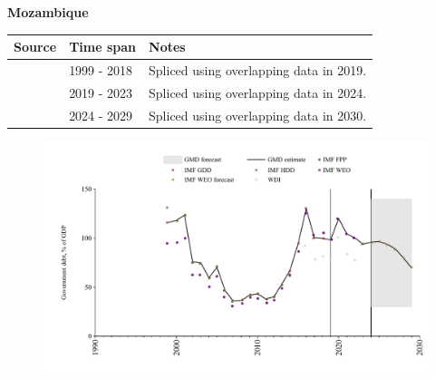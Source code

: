 \documentclass[12pt,a4paper,landscape]{article}
\begin{document}
\begin{adjustbox}{max totalsize={\paperwidth}{\paperheight},center}
\begin{minipage}[t][\textheight][t]{\textwidth}
\vspace*{0.5cm}
{}
\begin{center}
{\Large\bfseries Mozambique}
\end{center}
\vspace{0.5cm}
\begin{table}[H]
\centering
\small
\begin{tabular}{|l|l|l|}
\hline
\textbf{Source} & \textbf{Time span} & \textbf{Notes} \\
\hline
\rowcolor{white}\cite{IMF_GDD}& 1999 - 2018 &Spliced using overlapping data in 2019.\\
\rowcolor{lightgray}\cite{IMF_FPP}& 2019 - 2023 &Spliced using overlapping data in 2024.\\
\rowcolor{white}\cite{IMF_WEO_forecast}& 2024 - 2029 &Spliced using overlapping data in 2030.\\
\hline
\end{tabular}
\end{table}
\begin{figure}[H]
\centering
\includegraphics[width=\textwidth,height=0.6\textheight,keepaspectratio]{graphs/MOZ_govdebt_GDP.pdf}
\end{figure}
\end{minipage}
\end{adjustbox}
\end{document}
